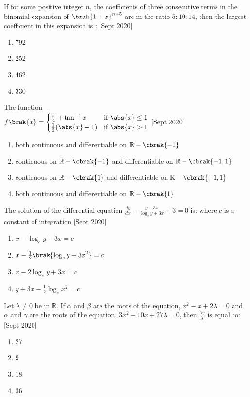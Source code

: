 	\item
	If for some positive integer $n$, the coefficients of three consecutive terms in the binomial expansion of $\brak{1+x}^{n+5}$ are in the ratio $5:10:14$, then the largest coefficient in this expansion is :
	\hfill [Sept 2020]
		\begin{enumerate}
			\item 792
			\item 252
			\item 462
			\item 330
		\end{enumerate}
	\item
	The function \\
	$f\brak{x} =
	\begin{cases}
    		\frac{\pi}{4} + \tan^{-1}{x} & \text{if } \abs{x} \leq 1 \\
    		\frac{1}{2}(\abs{x}-1) & \text{if } \abs{x} > 1
	\end{cases}
	$
	\hfill [Sept 2020]
		\begin{enumerate}
			\item  both continuous and differentiable on $\mathbb{R}-\cbrak{-1}$
			\item continuous on $\mathbb{R}-\cbrak{-1}$ and differentiable on $\mathbb{R}-\cbrak{-1,1}$
			\item continuous on $\mathbb{R}-\cbrak{1}$ and differentiable on $\mathbb{R}-\cbrak{-1,1}$
			\item both continuous and differentiable on $\mathbb{R}-\cbrak{1}$
		\end{enumerate}
	\item 
	The solution of the differential equation $\frac{dy}{dx}-\frac{y+3x}{\log_e{y+3x}} + 3 = 0$ is: where $c$ is a constant of integration
	\hfill [Sept 2020]
		\begin{enumerate}
			\item $x - \log_{e}{y+3x} = c$
			\item $x - \frac{1}{2}\brak{{\log_{e}{y+3x}}^2} = c$
			\item $x - 2\log_{e}{y+3x} = c$
			\item $y + 3x - \frac{1}{2}\log_{e}{x}^{2} = c$
		\end{enumerate}
	\item 
	Let $\lambda \neq 0$ be in $\mathbb{R}$. If $\alpha$ and $\beta$ are the roots of the equation, $x^{2}-x+2\lambda = 0$ and $\alpha$ and $\gamma$ are the roots of the equation, $3x^{2}-10x+27\lambda = 0$, then $\frac{\beta\gamma}{\lambda}$ is equal to:
	\hfill [Sept 2020]
		\begin{enumerate}
			\item 27
			\item 9
			\item 18
			\item 36
		\end{enumerate}

